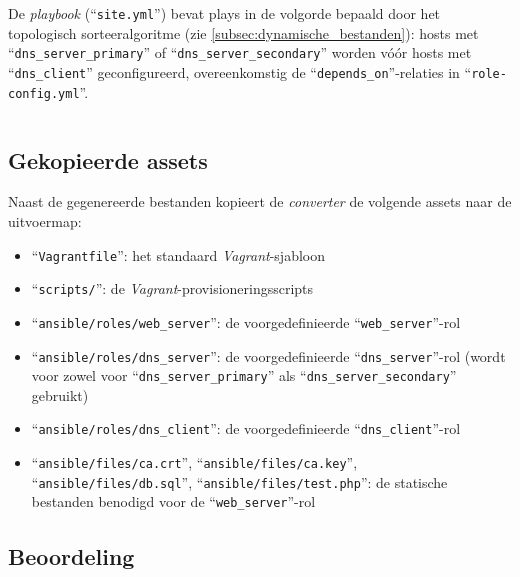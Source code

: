 De \emph{playbook} (``\texttt{site.yml}'') bevat plays in de volgorde bepaald door het topologisch sorteeralgoritme (zie \autoref{subsec:dynamische_bestanden}): hosts met ``\texttt{dns\_server\_primary}'' of ``\texttt{dns\_server\_secondary}'' worden vóór hosts met ``\texttt{dns\_client}'' geconfigureerd, overeenkomstig de ``\texttt{depends\_on}''-relaties in ``\texttt{role-config.yml}''.

\begin{codeblock}
    \inputminted{yaml}{../project_files/output/infra_auto_lab_2_env/ansible/site.yml}
    \caption[Gegenereerde ``\texttt{site.yml}'' voor testcase 2]{De door de \emph{converter} gegenereerde ``\texttt{site.yml}'' voor testcase 2 (\emph{Infrastructure Automation}, labo 2).}
    \label{code:site_infra_auto_lab2}
\end{codeblock}

\subsection{Gekopieerde assets}%
\label{subsec:testcase2_assets}

Naast de gegenereerde bestanden kopieert de \emph{converter} de volgende assets naar de uitvoermap:

\begin{itemize}
    \item ``\texttt{Vagrantfile}'': het standaard \emph{Vagrant}-sjabloon
    \item ``\texttt{scripts/}'': de \emph{Vagrant}-provisioneringsscripts
    \item ``\texttt{ansible/roles/web\_server}'': de voorgedefinieerde ``\texttt{web\_server}''-rol
    \item ``\texttt{ansible/roles/dns\_server}'': de voorgedefinieerde ``\texttt{dns\_server}''-rol (wordt voor zowel voor ``\texttt{dns\_server\_primary}'' als ``\texttt{dns\_server\_secondary}'' gebruikt)
    \item ``\texttt{ansible/roles/dns\_client}'': de voorgedefinieerde ``\texttt{dns\_client}''-rol
    \item ``\texttt{ansible/files/ca.crt}'', ``\texttt{ansible/files/ca.key}'', \\``\texttt{ansible/files/db.sql}'', ``\texttt{ansible/files/test.php}'': de statische bestanden benodigd voor de ``\texttt{web\_server}''-rol
\end{itemize}

\subsection{Beoordeling}%
\label{subsec:testcase2_beoordeling}

